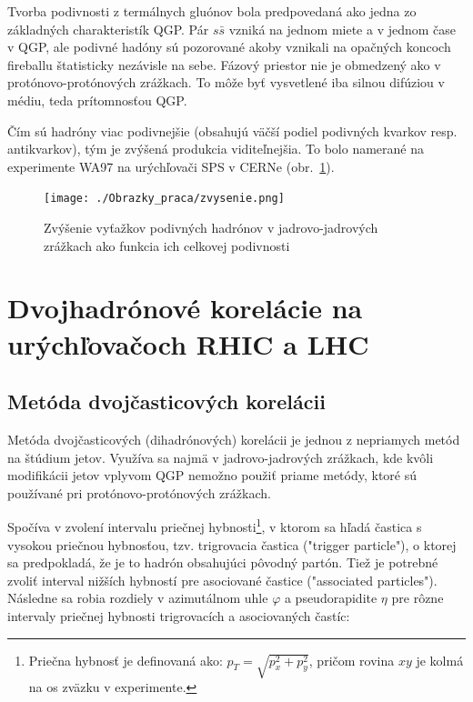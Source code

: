 \documentclass[thesismargins, thesislinespacing]{rnthesis}
\begin{document}
Tvorba podivnosti z termálnych gluónov bola predpovedaná ako jedna zo \-zák\-lad\-ných charakteristík QGP. Pár $s \bar{s}$ vzniká na jednom miete a v jednom čase v QGP, ale podivné hadóny sú pozorované akoby vznikali na opačných koncoch fireballu štatisticky nezávisle na sebe. Fázový priestor nie je obmedzený ako v protónovo-protónových zrážkach. To môže byť vysvetlené iba silnou difúziou v médiu, teda prítomnosťou QGP.

Čím sú hadróny viac podivnejšie (obsahujú väčší podiel podivných kvarkov resp. antikvarkov), tým je zvýšená produkcia viditeľnejšia. To bolo namerané na experimente WA97 na urýchľovači SPS v CERNe (obr.~\ref{zvysenie}).


\begin{figure}[hbtp!]
	\begin{center}
		\texttt{[image: ./Obrazky\_praca/zvysenie.png]}
		\caption{ Zvýšenie vyťažkov podivných hadrónov v jadrovo-jadrových zrážkach ako funkcia ich celkovej podivnosti \cite{zvysenie}}
		\label{zvysenie}
	\end{center}
\end{figure}  



\chapter{Dvojhadrónové korelácie na urýchľovačoch RHIC a LHC}

\section{Metóda dvojčasticových korelácii}
Metóda dvojčasticových (dihadrónových) korelácii je jednou z nepriamych metód na štúdium jetov. Využíva sa najmä v jadrovo-jadrových zrážkach, kde kvôli \-mo\-di\-fi\-ká\-cii jetov vplyvom QGP nemožno použiť priame metódy, ktoré sú používané pri protónovo-protónových zrážkach.

Spočíva v zvolení intervalu priečnej hybnosti\footnote{Priečna hybnosť je definovaná ako: $p_T=\sqrt{p_x^2+p_y^2}$, pričom rovina $xy$ je kolmá na os zväzku v experimente.}, v ktorom sa hľadá častica s vysokou priečnou hybnosťou, tzv. trigrovacia častica ("trigger particle"), o ktorej sa predpokladá, že je to hadrón obsahujúci pôvodný partón. Tiež je potrebné zvoliť interval nižších hybností pre asociované častice ("\-associated particles"). Následne sa robia rozdiely v \-a\-zi\-mu\-tál\-nom uhle $\varphi$ a pseudorapidite $\eta$ pre rôzne intervaly priečnej hybnosti trigrovacích a asociovaných častíc:
\end{document}
